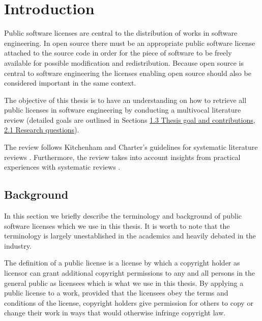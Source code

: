 \chapter{Introduction\label{intro}}
Public software licenses are central to the distribution of works in software engineering. In open source there must be an appropriate public software license attached to the source code in order for the piece of software to be freely available for possible modification and redistribution. Because open source is central to software engineering the licenses enabling open source should also be considered important in the same context.

The objective of this thesis is to have an understanding on how to retrieve all public licenses in software engineering by conducting a multivocal literature review (detailed goals are outlined in Sections \hyperref[background]{1.3 Thesis goal and contributions}, \hyperref[rqs]{2.1 Research questions}).

The review follows Kitchenham and Charter's guidelines for systematic literature reviews \citep{kitchenham2007}. Furthermore, the review takes into account insights from practical experiences with systematic reviews \citep{mahdavi-hezahevi}\citep{nurmivaara}.

\section{Background}\label{background}\label{sec:bg}
In this section we briefly describe the terminology and background of public software licenses which we use in this thesis. It is worth to note that the terminology is largely unestablished in the academics and heavily debated in the industry.

The definition of a public license is a license by which a copyright holder as licensor can grant additional copyright permissions to any and all persons in the general public as licensees \citep{hietanen2007license} which is what we use in this thesis. By applying a public license to a work, provided that the licensees obey the terms and conditions of the license, copyright holders give permission for others to copy or change their work in ways that would otherwise infringe copyright law.

